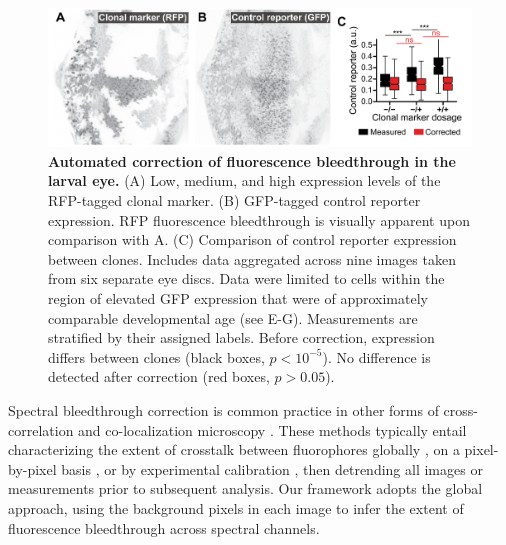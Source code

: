 \documentclass[10pt,letterpaper]{article}
\begin{document}
\begin{figure}[t]
\centering
\includegraphics[scale=1.0]{./figure_3}
\caption{\textbf{Automated correction of fluorescence bleedthrough in the larval eye.}
(A) Low, medium, and high expression levels of the RFP-tagged clonal marker. (B) GFP-tagged control reporter expression. RFP fluorescence bleedthrough is visually apparent upon comparison with A. (C) Comparison of control reporter expression between clones. Includes data aggregated across nine images taken from six separate eye discs. Data were limited to cells within the region of elevated GFP expression that were of approximately comparable developmental age (see  E-G). Measurements are stratified by their assigned labels. Before correction, expression differs between clones (black boxes, $p<10^{-5}$). No difference is detected after correction (red boxes, $p>0.05$).}
\label{fig3}
\end{figure}

Spectral bleedthrough correction is common practice in other forms of cross-correlation and co-localization microscopy \cite{Bacia2012,Zinchuk2007}. These methods typically entail characterizing the extent of crosstalk between fluorophores globally \cite{Arsenovic2017,Kim2013}, on a pixel-by-pixel basis \cite{Elangovan2003}, or by experimental calibration \cite{Bacia2012}, then detrending all images or measurements prior to subsequent analysis. Our framework adopts the global approach, using the background pixels in each image to infer the extent of fluorescence bleedthrough across spectral channels.
\end{document}

